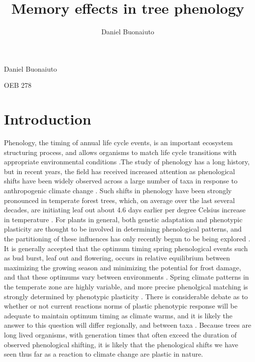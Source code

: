 \documentclass{article}\usepackage[]{graphicx}\usepackage[]{color}
\begin{document}
\title{Memory effects in tree phenology}
\author{Daniel Buonaiuto}
Daniel Buonaiuto
\par OEB 278
\par\data{\today}
\section*{Introduction}
\par Phenology, the timing of annual life cycle events, is an important ecosystem structuring process, and allows organisms to match life cycle transitions with appropriate environmental conditions \citep{Forrest2010}.The study of phenology has a long history, but in recent years, the field has received increased attention as phenological shifts have been widely observed across a large number of taxa in response to anthropogenic climate change \citep{Menzel2006}. Such shifts in phenology have been strongly pronounced in temperate forest trees, which, on average over the last several decades, are initiating leaf out about 4.6 days earlier per degree Celsius increase in temperature \citep{Wolkovich2012}. For plants in general, both genetic adaptation and phenotypic plasticity are thought to be involved in determining phenological patterns, and the partitioning of these influences has only recently begun to be being explored \citep{Anderson2012}. It is generally accepted that the optimum timing spring phenological events such as bud burst, leaf out and flowering, occurs in relative equilibrium between maximizing the growing season and minimizing the potential for frost damage, and that these optimums vary between environments \citep{Kramer1995}. Spring climate patterns in the temperate zone are highly variable, and more precise phenolgical matching is strongly determined by phenotypic plasticity \citep{Vitasse2010,Vitasse2013}. There is considerable debate as to whether or not current reactions norms of plastic phenotypic response will be adequate to maintain optimum timing as climate warms, and it is likely the answer to this question will differ regionally, and between taxa \citep{Matesanz2010}. Because trees are long lived organisms, with generation times that often exceed the duration of observed phenological shifting, it is likely that the phenological shifts we have seen thus far as a reaction to climate change are plastic in nature.
\end{document}
